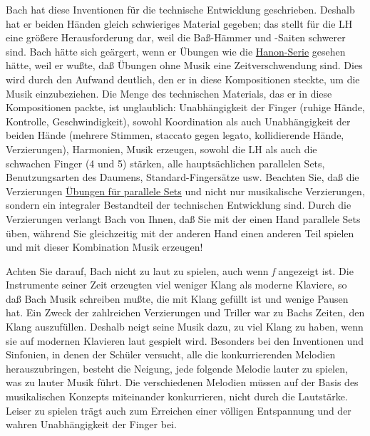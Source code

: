 Bach hat diese Inventionen für die technische Entwicklung geschrieben.
Deshalb hat er beiden Händen gleich schwieriges Material gegeben; das stellt für die LH eine größere Herausforderung dar, weil die Baß-Hämmer und -Saiten schwerer sind.
Bach hätte sich geärgert, wenn er Übungen wie die \hyperref[c1iii7h]{Hanon-Serie} gesehen hätte, weil er wußte, daß Übungen ohne Musik eine Zeitverschwendung sind. Dies wird durch den Aufwand deutlich, den er in diese Kompositionen steckte, um die Musik einzubeziehen.
Die Menge des technischen Materials, das er in diese Kompositionen packte, ist unglaublich: Unabhängigkeit der Finger (ruhige Hände, Kontrolle, Geschwindigkeit), sowohl Koordination als auch Unabhängigkeit der beiden Hände (mehrere Stimmen, staccato gegen legato, kollidierende Hände, Verzierungen), Harmonien, Musik erzeugen, sowohl die LH als auch die schwachen Finger (4 und 5) stärken, alle hauptsächlichen parallelen Sets, Benutzungsarten des Daumens, Standard-Fingersätze usw.
Beachten Sie, daß die Verzierungen \hyperref[c1iii7b]{Übungen für parallele Sets} und nicht nur musikalische Verzierungen, sondern ein integraler Bestandteil der technischen Entwicklung sind.
Durch die Verzierungen verlangt Bach von Ihnen, daß Sie mit der einen Hand parallele Sets üben, während Sie gleichzeitig mit der anderen Hand einen anderen Teil spielen und mit dieser Kombination Musik erzeugen!

Achten Sie darauf, Bach nicht zu laut zu spielen, auch wenn \textit{f} angezeigt ist.
Die Instrumente seiner Zeit erzeugten viel weniger Klang als moderne Klaviere, so daß Bach Musik schreiben mußte, die mit Klang gefüllt ist und wenige Pausen hat.
Ein Zweck der zahlreichen Verzierungen und Triller war zu Bachs Zeiten, den Klang auszufüllen.
Deshalb neigt seine Musik dazu, zu viel Klang zu haben, wenn sie auf modernen Klavieren laut gespielt wird.
Besonders bei den Inventionen und Sinfonien, in denen der Schüler versucht, alle die konkurrierenden Melodien herauszubringen, besteht die Neigung, jede folgende Melodie lauter zu spielen, was zu lauter Musik führt.
Die verschiedenen Melodien müssen auf der Basis des musikalischen Konzepts miteinander konkurrieren, nicht durch die Lautstärke.
Leiser zu spielen trägt auch zum Erreichen einer völligen Entspannung und der wahren Unabhängigkeit der Finger bei.

